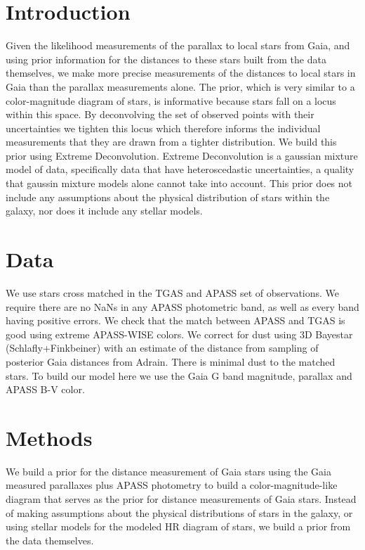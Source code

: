 \documentclass[iop]{emulateapj}
\begin{document}


\section{Introduction}

Given the likelihood measurements of the parallax to local stars from Gaia, and using prior information for the distances to these stars built from the data themselves, we make more precise measurements of the distances to local stars in Gaia than the parallax measurements alone. The prior, which is very similar to a color-magnitude diagram of stars, is informative because stars fall on a locus within this space. By deconvolving the set of observed points with their uncertainties we tighten this locus which therefore informs the individual measurements that they are drawn from a tighter distribution. We build this prior using Extreme Deconvolution. Extreme Deconvolution is a gaussian mixture model of data, specifically data that have heteroscedastic uncertainties, a quality that gaussin mixture models alone cannot take into account. This prior does not include any assumptions about the physical distribution of stars within the galaxy, nor does it include any stellar models.

\section{Data}

We use stars cross matched in the TGAS and APASS set of observations. We require there are no NaNs in any APASS photometric band, as well as every band having positive errors. We check that the match between APASS and TGAS is good using extreme APASS-WISE colors. We correct for dust using 3D Bayestar (Schlafly+Finkbeiner) with an estimate of the distance from sampling of posterior Gaia distances from Adrain. There is minimal dust to the matched stars. To build our model here we use the Gaia G band magnitude, parallax and APASS B-V color.

\section{Methods}

We build a prior for the distance measurement of Gaia stars using the Gaia measured parallaxes plus APASS photometry to build a color-magnitude-like diagram that serves as the prior for distance measurements of Gaia stars. Instead of making assumptions about the physical distributions of stars in the galaxy, or using stellar models for the modeled HR diagram of stars, we build a prior from the data themselves.
\end{document}
